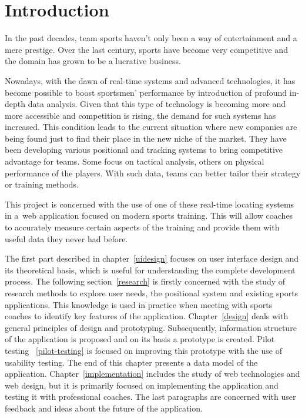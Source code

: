 \chapter{Introduction}
In the past decades, team sports haven’t only been a way of entertainment and a mere prestige. Over the last century, sports have become very competitive and the domain has grown to be a lucrative business.

Nowadays, with the dawn of real-time systems and advanced technologies, it has become possible to boost sportsmen’ performance by introduction of profound in-depth data analysis. Given that this type of technology is becoming more and more accessible and competition is rising, the demand for such systems has increased. This condition leads to the current situation where new companies are being found just to find their place in the new niche of the market. They have been developing various positional and tracking systems to bring competitive advantage for teams. Some focus on tactical analysis, others on physical performance of the players. With such data, teams can better tailor their strategy or training methods. 

This project is concerned with the use of one of these real-time locating systems in a~web application focused on modern sports training. This will allow coaches to accurately measure certain aspects of the training and provide them with useful data they never had before.

The first part described in chapter~\ref{uidesign} focuses on user interface design and its theoretical basis, which is useful for understanding the complete development process. The following section~\ref{research} is firstly concerned with the study of research methods to explore user needs, the positional system and existing sports applications. This knowledge is used in practice when meeting with sports coaches to identify key features of the application. Chapter~\ref{design} deals with general principles of design and prototyping. Subsequently, information structure of the application is proposed and on its basis a prototype is created. Pilot testing ~\ref{pilot-testing} is focused on improving this prototype with the use of usability testing. The end of this chapter presents a data model of the application. Chapter~\ref{implementation} includes the study of web technologies and web design, but it is primarily focused on implementing the application and testing it with professional coaches. The last paragraphs are concerned with user feedback and ideas about the future of the application.

